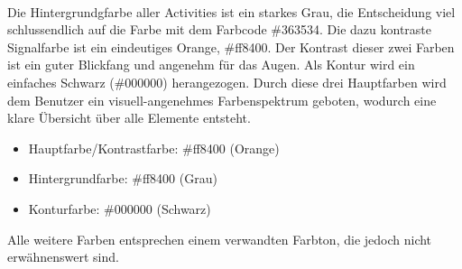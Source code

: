\documentclass[FIPLY_base.tex]{subfiles}
\begin{document}
	\ \\
	Die Hintergrundgfarbe aller Activities ist ein starkes Grau, die Entscheidung viel schlussendlich auf die Farbe mit dem Farbcode \#363534. Die dazu kontraste Signalfarbe ist ein eindeutiges Orange, \#ff8400. Der Kontrast dieser zwei Farben ist ein guter Blickfang und angenehm für das Augen. Als Kontur wird ein einfaches Schwarz (\#000000) herangezogen. Durch diese drei Hauptfarben wird dem Benutzer ein visuell-angenehmes Farbenspektrum geboten, wodurch eine klare Übersicht über alle Elemente entsteht.
	\begin{itemize}
	 	\item Hauptfarbe/Kontrastfarbe: \#ff8400 (Orange)
	 	\item Hintergrundfarbe: \#ff8400 (Grau)
	 	\item Konturfarbe: \#000000 (Schwarz)
	\end{itemize}
	Alle weitere Farben entsprechen einem verwandten Farbton, die jedoch nicht erwähnenswert sind.
	
\end{document}
